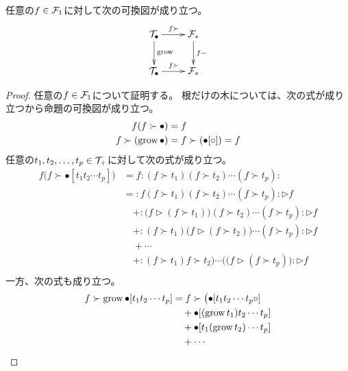 	\begin{proposition}[木の成長と微分のべき乗]\label{prop:木の成長と微分のべき乗} %
		任意の$f\in{\mathcal{F}}_1$に対して次の可換図が成り立つ。
		\begin{equation*}\xymatrix{
			\mycal{T}_\bullet \ar[d]^{\myop{grow}} \ar[r]^{f\succ}
				& \mycal{F}_* \ar[d]^{f-} \\
			\mycal{T}_\bullet \ar[r]^{f\succ} & \mycal{F}_* \\
		}\end{equation*}
	\end{proposition} %
	\begin{proof} %
		任意の$f\in{\mathcal{F}}_1$について証明する。
		根だけの木については、次の式が成り立つから命題の可換図が成り立つ。
		\begin{equation*}\begin{split} %
			f(f\succ\bullet) &= f \\
			f\succ(\myop{grow}\bullet) &= f\succ(\bullet[\circ])= f
		\end{split}\end{equation*} %
		任意の$t_1,t_2,\dots,t_p\in{\mathcal{T}}_+$に対して次の式が成り立つ。
		\begin{equation*}\begin{split} %
			f\bigl(f\succ\bullet[t_1t_2\cdots t_p]\bigr)
			&= f:(f\succ t_1)(f\succ t_2)\cdots(f\succ t_p): \\
			&= :f(f\succ t_1)(f\succ t_2)\cdots(f\succ t_p):\rhd f \\
			&\quad + :\bigl(f\rhd(f\succ t_1)\bigr)(f\succ t_2)\cdots(f\succ t_p):\rhd f \\
			&\quad + :(f\succ t_1)\bigl(f\rhd(f\succ t_2)\bigr)\cdots(f\succ t_p):\rhd f \\
			&\quad + \cdots \\
			&\quad + :(f\succ t_1)f\succ t_2)\cdots(\bigl(f\rhd(f\succ t_p)\bigr):\rhd f \\
		\end{split}\end{equation*} %
		一方、次の式も成り立つ。
		\begin{equation*}\begin{split} %
			f\succ\myop{grow}\bullet[t_1t_2\cdots t_p]
			&= f\succ\bigl(\bullet[t_1t_2\cdots t_p\circ] \\
			&\quad + \bullet[(\myop{grow}t_1)t_2\cdots t_p] \\
			&\quad + \bullet[t_1(\myop{grow}t_2)\cdots t_p] \\
			&\quad + \cdots \\

\end{split}
\end{equation*}
\end{proof}
